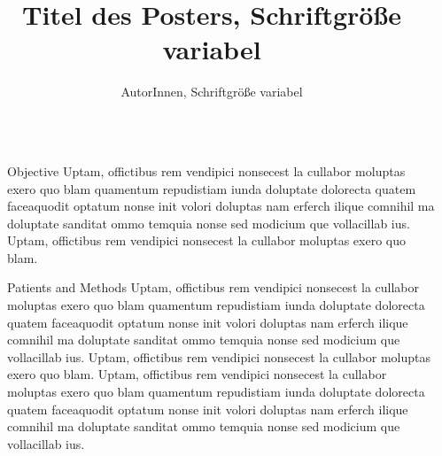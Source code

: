 \documentclass[final]{beamer}
\title{Titel des Posters, Schriftgröße variabel} %
\author{AutorInnen, Schriftgröße variabel} %
\institute{Klinik, Medizinische Universität Wien, Schriftgröße variabel} %
\newlength{\sepmargin}
\newlength{\onecolwid}
\begin{document}
  \setlength{\belowcaptionskip}{2ex} %
  \setlength\belowdisplayshortskip{1ex} %
  
  
  \begin{frame}[t] %

      \begin{columns}[t] %
	  
      \begin{column}{\sepmargin}\end{column}
      
	    \begin{column}{\onecolwid} %


		  \begin{block}{Objective}
          Uptam, offictibus rem vendipici nonsecest la cullabor moluptas exero quo blam quamentum repudistiam iunda doluptate dolorecta quatem faceaquodit optatum nonse init volori doluptas nam erferch ilique comnihil ma doluptate sanditat ommo temquia nonse sed modicium que vollacillab ius. Uptam, offictibus rem vendipici nonsecest la cullabor moluptas exero quo blam.
          \end{block}
          
          \begin{block}{Patients and Methods}
          Uptam, offictibus rem vendipici nonsecest la cullabor moluptas exero quo blam quamentum repudistiam iunda doluptate dolorecta quatem faceaquodit optatum nonse init volori doluptas nam erferch ilique comnihil ma doluptate sanditat ommo temquia nonse sed modicium que vollacillab ius. Uptam, offictibus rem vendipici nonsecest la cullabor moluptas exero quo blam.
Uptam, offictibus rem vendipici nonsecest la cullabor moluptas exero quo blam quamentum repudistiam iunda doluptate dolorecta quatem faceaquodit optatum nonse init volori doluptas nam erferch ilique comnihil ma doluptate sanditat ommo temquia nonse sed modicium que vollacillab ius.
          \end{block}
          

\end{column}
\end{columns}
\end{frame}
\end{document}
